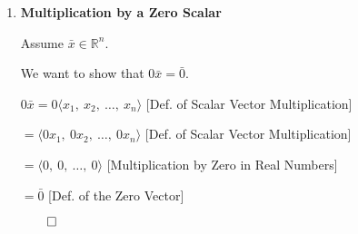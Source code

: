 \begin{proofbox}
\begin{enumerate}[label=\arabic*., resume=vecprops]
\quad $= \langle -x_1,\ -x_2,\ \ldots,\ -x_n \rangle$ \hfill [Multiplication by $-1$ in Real Numbers]

\quad $= -\bar{x}$ \hfill [Def. of Additive Inverse of a Vector]

\hfill $\qed$

\item \textbf{Multiplication by a Zero Scalar}

Assume $\bar{x} \in \mathbb{R}^n$.

We want to show that $0\bar{x} = \bar{0}$.

\quad $0\bar{x} = 0\langle x_1,\ x_2,\ \ldots,\ x_n \rangle$ \hfill [Def. of Scalar Vector Multiplication]

\quad $= \langle 0x_1,\ 0x_2,\ \ldots,\ 0x_n \rangle$ \hfill [Def. of Scalar Vector Multiplication]

\quad $= \langle 0,\ 0,\ \ldots,\ 0 \rangle$ \hfill [Multiplication by Zero in Real Numbers]

\quad $= \bar{0}$ \hfill [Def. of the Zero Vector]

\hfill $\qed$

\end{enumerate}
\end{proofbox}

\newpage

